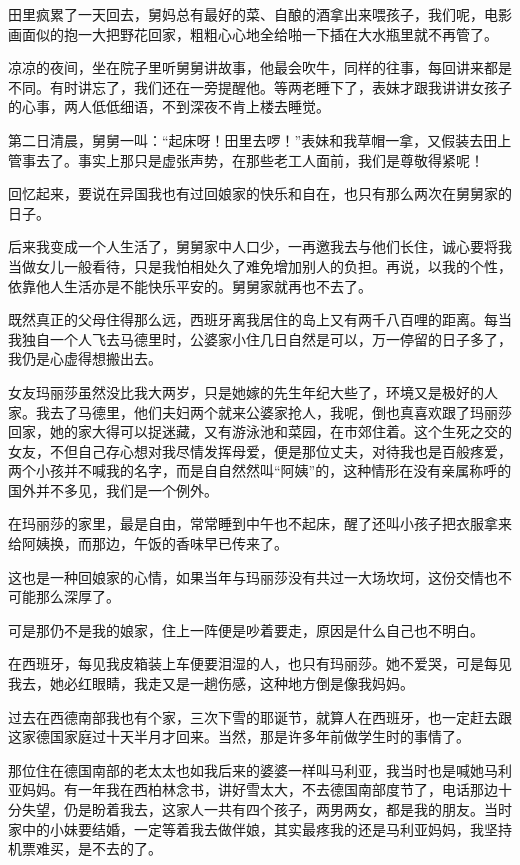 \par 田里疯累了一天回去，舅妈总有最好的菜、自酿的酒拿出来喂孩子，我们呢，电影画面似的抱一大把野花回家，粗粗心心地全给啪一下插在大水瓶里就不再管了。
\par 凉凉的夜间，坐在院子里听舅舅讲故事，他最会吹牛，同样的往事，每回讲来都是不同。有时讲忘了，我们还在一旁提醒他。等两老睡下了，表妹才跟我讲讲女孩子的心事，两人低低细语，不到深夜不肯上楼去睡觉。
\par 第二日清晨，舅舅一叫：“起床呀！田里去啰！”表妹和我草帽一拿，又假装去田上管事去了。事实上那只是虚张声势，在那些老工人面前，我们是尊敬得紧呢！
\par 回忆起来，要说在异国我也有过回娘家的快乐和自在，也只有那么两次在舅舅家的日子。
\par 后来我变成一个人生活了，舅舅家中人口少，一再邀我去与他们长住，诚心要将我当做女儿一般看待，只是我怕相处久了难免增加别人的负担。再说，以我的个性，依靠他人生活亦是不能快乐平安的。舅舅家就再也不去了。
\par 既然真正的父母住得那么远，西班牙离我居住的岛上又有两千八百哩的距离。每当我独自一个人飞去马德里时，公婆家小住几日自然是可以，万一停留的日子多了，我仍是心虚得想搬出去。
\par 女友玛丽莎虽然没比我大两岁，只是她嫁的先生年纪大些了，环境又是极好的人家。我去了马德里，他们夫妇两个就来公婆家抢人，我呢，倒也真喜欢跟了玛丽莎回家，她的家大得可以捉迷藏，又有游泳池和菜园，在市郊住着。这个生死之交的女友，不但自己存心想对我尽情发挥母爱，便是那位丈夫，对待我也是百般疼爱，两个小孩并不喊我的名字，而是自自然然叫“阿姨”的，这种情形在没有亲属称呼的国外并不多见，我们是一个例外。
\par 在玛丽莎的家里，最是自由，常常睡到中午也不起床，醒了还叫小孩子把衣服拿来给阿姨换，而那边，午饭的香味早已传来了。
\par 这也是一种回娘家的心情，如果当年与玛丽莎没有共过一大场坎坷，这份交情也不可能那么深厚了。
\par 可是那仍不是我的娘家，住上一阵便是吵着要走，原因是什么自己也不明白。
\par 在西班牙，每见我皮箱装上车便要泪湿的人，也只有玛丽莎。她不爱哭，可是每见我去，她必红眼睛，我走又是一趟伤感，这种地方倒是像我妈妈。
\par 过去在西德南部我也有个家，三次下雪的耶诞节，就算人在西班牙，也一定赶去跟这家德国家庭过十天半月才回来。当然，那是许多年前做学生时的事情了。
\par 那位住在德国南部的老太太也如我后来的婆婆一样叫马利亚，我当时也是喊她马利亚妈妈。有一年我在西柏林念书，讲好雪太大，不去德国南部度节了，电话那边十分失望，仍是盼着我去，这家人一共有四个孩子，两男两女，都是我的朋友。当时家中的小妹要结婚，一定等着我去做伴娘，其实最疼我的还是马利亚妈妈，我坚持机票难买，是不去的了。
